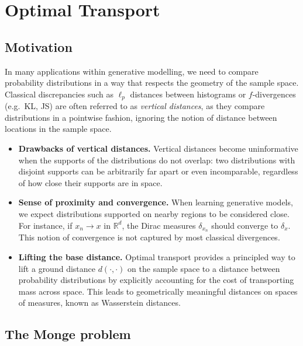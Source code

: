 \chapter{Optimal Transport}




\section{Motivation}

In many applications within generative modelling, we need to compare probability distributions in a way that respects the geometry of the sample space. Classical discrepancies such as $\ell_p$ distances between histograms or $f$-divergences (e.g.\ KL, JS) are often
referred to as \emph{vertical distances}, as they compare distributions in a pointwise fashion, ignoring the notion of distance between locations in the sample space.

\begin{itemize}
    \item \textbf{Drawbacks of vertical distances.}
    Vertical distances become uninformative when the supports of the distributions do not overlap: two distributions with disjoint supports can be arbitrarily far apart or even incomparable, regardless of how close their supports are in space.

    \item \textbf{Sense of proximity and convergence.}
    When learning generative models, we expect distributions supported on nearby regions to be considered close. For instance, if $x_n \to x$ in $\mathbb{R}^d$, the Dirac measures $\delta_{x_n}$ should converge to $\delta_x$. This notion of convergence is not captured by most classical divergences.

    \item \textbf{Lifting the base distance.}
    Optimal transport provides a principled way to lift a ground distance
    $d(\cdot,\cdot)$ on the sample space to a distance between probability
    distributions by explicitly accounting for the cost of transporting mass across space. This leads to geometrically meaningful distances on spaces of measures, known as Wasserstein distances.
\end{itemize}

\section{The Monge problem}

